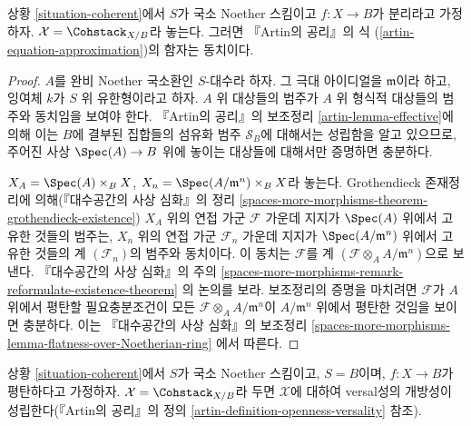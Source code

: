 \begin{lemma}
\label{lemma-coherent-existence}
상황 \ref{situation-coherent}에서 $S$가 국소 Noether 스킴이고
$f : X \to B$가 분리라고 가정하자.
$\mathcal{X} = \Cohstack_{X/B}$라 놓는다. 그러면
『Artin의 공리』의 식 (\ref{artin-equation-approximation})의 함자는
동치이다.
\end{lemma}

\begin{proof}
$A$를 완비 Noether 국소환인 $S$-대수라 하자. 그 극대 아이디얼을
$\mathfrak m$이라 하고, 잉여체 $k$가 $S$ 위 유한형이라고 하자.
$A$ 위 대상들의 범주가 $A$ 위 형식적 대상들의 범주와 동치임을
보여야 한다. 『Artin의 공리』의 보조정리
\ref{artin-lemma-effective}에 의해 이는 $B$에 결부된 집합들의
섬유화 범주 $\mathcal{S}_B$에 대해서는 성립함을 알고 있으므로,
주어진 사상 $\Spec(A) \to B$ 위에 놓이는 대상들에 대해서만
증명하면 충분하다.

\medskip\noindent
$X_A = \Spec(A) \times_B X$,
$X_n = \Spec(A/\mathfrak m^n) \times_B X$라 놓는다.
Grothendieck 존재정리에 의해(『대수공간의 사상 심화』의 정리
\ref{spaces-more-morphisms-theorem-grothendieck-existence})
$X_A$ 위의 연접 가군 $\mathcal{F}$ 가운데 지지가
$\Spec(A)$ 위에서 고유한 것들의 범주는, $X_n$ 위의 연접 가군
$\mathcal{F}_n$ 가운데 지지가 $\Spec(A/\mathfrak m^n)$ 위에서
고유한 것들의 계 $(\mathcal{F}_n)$의 범주와 동치이다.
이 동치는 $\mathcal{F}$를 계
$(\mathcal{F} \otimes_A A/\mathfrak m^n)$으로 보낸다.
『대수공간의 사상 심화』의 주의
\ref{spaces-more-morphisms-remark-reformulate-existence-theorem}
의 논의를 보라. 보조정리의 증명을 마치려면
$\mathcal{F}$가 $A$ 위에서 평탄할 필요충분조건이 모든
$\mathcal{F} \otimes_A A/\mathfrak m^n$이
$A/\mathfrak m^n$ 위에서 평탄한 것임을 보이면 충분하다.
이는 『대수공간의 사상 심화』의 보조정리
\ref{spaces-more-morphisms-lemma-flatness-over-Noetherian-ring}
에서 따른다.
\end{proof}

\begin{lemma}
\label{lemma-coherent-defo-thy}
상황 \ref{situation-coherent}에서 $S$가 국소 Noether 스킴이고,
$S = B$이며, $f : X \to B$가 평탄하다고 가정하자.
$\mathcal{X} = \Cohstack_{X/B}$라 두면 $\mathcal{X}$에 대하여
versal성의 개방성이 성립한다(『Artin의 공리』의 정의
\ref{artin-definition-openness-versality} 참조).
\end{lemma}


